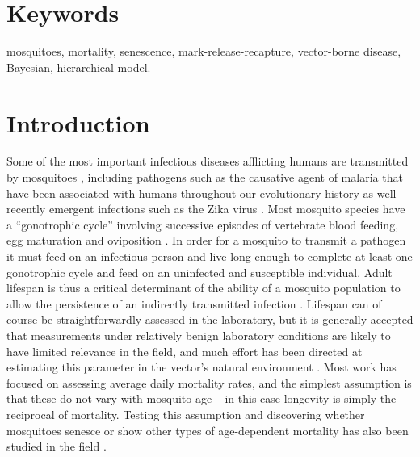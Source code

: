 \documentclass[]{article}
\begin{document}
\section{Keywords}\label{keywords}

mosquitoes, mortality, senescence, mark-release-recapture, vector-borne disease, Bayesian, hierarchical model.

\section{Introduction}\label{introduction}

Some of the most important infectious diseases afflicting humans are
transmitted by mosquitoes \citep{gates2014}, including pathogens such as the causative
agent of malaria that have been associated with humans throughout our
evolutionary history \citep{carter2002evolutionary} as well recently emergent infections such as the
Zika virus \citep{world2016statement}. Most mosquito species have a ``gonotrophic cycle'' involving
successive episodes of vertebrate blood feeding, egg maturation and
oviposition \citep{silver2007mosquito}. In order for a mosquito to transmit a pathogen it must feed
on an infectious person and live long enough to complete at least one
gonotrophic cycle and feed on an uninfected and susceptible individual.
Adult lifespan is thus a critical determinant of the ability of a
mosquito population to allow the persistence of an indirectly
transmitted infection \citep{macdonald1957epidemiology}. Lifespan can of course be straightforwardly
assessed in the laboratory, but it is generally accepted that
measurements under relatively benign laboratory conditions are likely to
have limited relevance in the field, and much effort has been directed
at estimating this parameter in the vector's natural environment \citep{clements1981analysis,guerra2014global}. Most
work has focused on assessing average daily mortality rates, and the
simplest assumption is that these do not vary with mosquito age -- in
this case longevity is simply the reciprocal of mortality. Testing this
assumption and discovering whether mosquitoes senesce or show other
types of age-dependent mortality has also been studied in the field \citep{clements1981analysis,harrington2008age,hugo2014adult}.
\end{document}
